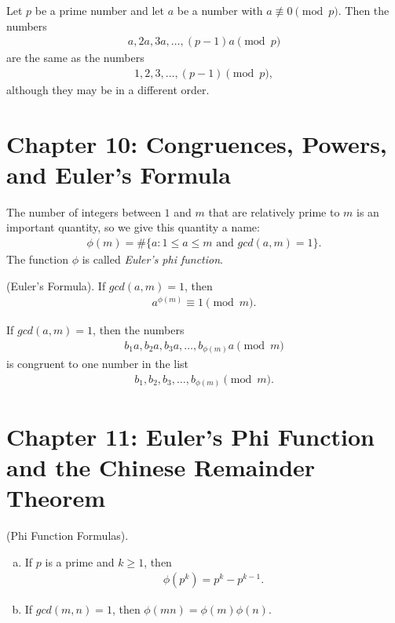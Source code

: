 \documentclass[graybox]{svmult}
\begin{document}
\begin{lemma}
Let $p$ be a prime number and let $a$ be a number with $a \not \equiv 0 \pmod p$. Then the numbers
\begin{align*}
a, 2a, 3a, \ldots, (p-1)a \pmod p
\end{align*}
are the same as the numbers
\begin{align*}
1, 2, 3, \ldots, (p-1) \pmod p,
\end{align*}
although they may be in a different order.
\end{lemma}

\section*{Chapter 10: Congruences, Powers, and Euler's Formula}

\begin{definition}
The number of integers between $1$ and $m$ that are relatively prime to $m$ is an important quantity, so we give this quantity a name:
\begin{align*}
\phi(m) = \#\{a : 1 \leqslant a \leqslant m \text{ and } gcd(a,m) = 1\}.
\end{align*}
The function $\phi$ is called \textit{Euler's phi function}.
\end{definition}

\begin{theorem}
(Euler's Formula). If $gcd(a, m)=1$, then
\begin{align*}
a^{\phi(m)} \equiv 1 \pmod m.
\end{align*}
\end{theorem}

\begin{lemma}
If $gcd(a,m) = 1$, then the numbers
\begin{align*}
b_1a,b_2a,b_3a,\ldots,b_{\phi(m)}a \pmod m
\end{align*}
is congruent to one number in the list
\begin{align*}
b_1,b_2,b_3,\ldots,b_{\phi(m)} \pmod m.
\end{align*}
\end{lemma}

\section*{Chapter 11: Euler's Phi Function and the Chinese Remainder Theorem}

\begin{theorem}
(Phi Function Formulas).
\begin{enumerate}[(a)]
\item If $p$ is a prime and $k \geqslant 1$, then
\begin{align*}
\phi(p^k)=p^k - p^{k-1}.
\end{align*}
\item If $gcd(m, n)=1$, then $\phi(mn) = \phi(m)\phi(n)$.
\end{enumerate}
\end{theorem}
\end{document}
